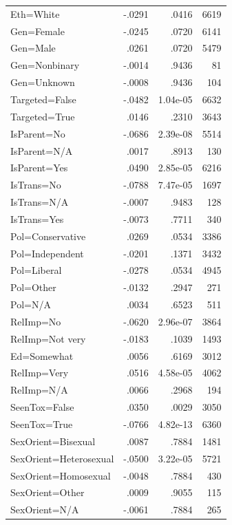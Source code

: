 \documentclass[11pt]{article}
\theoremstyle{definition}
\theoremstyle{plain}
\begin{document}
\begin{table}[t]
\begin{tabularx}{\columnwidth}{X r r r}
		\rowcolor{gray!15}
		Eth=White & -.0291 & .0416 & 6619 \\
		\rowcolor{gray!15}
		Gen=Female & -.0245 & .0720 & 6141 \\
		Gen=Male & .0261 & .0720 & 5479 \\
		\rowcolor{gray!15}
		Gen=Nonbinary & -.0014 & .9436 & 81 \\
		\rowcolor{gray!15}
		Gen=Unknown & -.0008 & .9436 & 104 \\
		\rowcolor{gray!15}
		Targeted=False & -.0482 & 1.04e-05 & 6632 \\
		Targeted=True & .0146 & .2310 & 3643 \\
		\rowcolor{gray!15}
		IsParent=No & -.0686 & 2.39e-08 & 5514 \\
		IsParent=N/A & .0017 & .8913 & 130 \\
		IsParent=Yes & .0490 & 2.85e-05 & 6216 \\
		\rowcolor{gray!15}
		IsTrans=No & -.0788 & 7.47e-05 & 1697 \\
		\rowcolor{gray!15}
		IsTrans=N/A & -.0007 & .9483 & 128 \\
		\rowcolor{gray!15}
		IsTrans=Yes & -.0073 & .7711 & 340 \\
		
		Pol=Conservative & .0269 & .0534 & 3386 \\
		\rowcolor{gray!15}
		Pol=Independent & -.0201 & .1371 & 3432 \\
		\rowcolor{gray!15}
		Pol=Liberal & -.0278 & .0534 & 4945 \\
		\rowcolor{gray!15}
		Pol=Other & -.0132 & .2947 & 271 \\
		Pol=N/A & .0034 & .6523 & 511 \\
		\rowcolor{gray!15}
		RelImp=No & -.0620 & 2.96e-07 & 3864 \\
		\rowcolor{gray!15}
		RelImp=Not very & -.0183 & .1039 & 1493 \\
		Ed=Somewhat & .0056 & .6169 & 3012 \\
		RelImp=Very & .0516 & 4.58e-05 & 4062 \\
		RelImp=N/A & .0066 & .2968 & 194 \\
		
		SeenTox=False & .0350 & .0029 & 3050 \\
		\rowcolor{gray!15}
		SeenTox=True & -.0766 & 4.82e-13 & 6360 \\
		
		SexOrient=Bisexual & .0087 & .7884 & 1481 \\
		\rowcolor{gray!15}
		SexOrient=Heterosexual & -.0500 & 3.22e-05 & 5721 \\
		\rowcolor{gray!15}
		SexOrient=Homosexual & -.0048 & .7884 & 430 \\
		SexOrient=Other & .0009 & .9055 & 115 \\
		\rowcolor{gray!15}
		SexOrient=N/A & -.0061 & .7884 & 265 \\
		

\end{tabularx}
\end{table}
\end{document}
